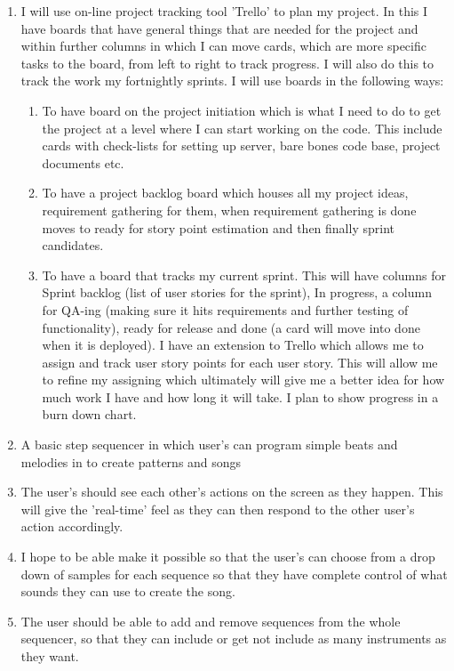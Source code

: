 \documentclass[a4paper]{article}
\begin{document}
\begin{enumerate}
    \item I will use on-line project tracking tool 'Trello' to plan my project. In this I have boards that have general things that are needed for the project and within further columns in which I can move cards, which are more specific tasks to the board, from left to right to track progress. I will also do this to track the work my fortnightly sprints. I will use boards in the following ways:
        \begin{enumerate}
            \item To have board on the project initiation which is what I need to do to get the project at a level where I can start working on the code. This include cards with check-lists for setting up server, bare bones code base, project documents etc.
            \item To have a project backlog board which houses all my project ideas, requirement gathering for them, when requirement gathering is done moves to ready for story point estimation and then finally sprint candidates.
            \item To have a board that tracks my current sprint. This will have columns for Sprint backlog (list of user stories for the sprint), In progress, a column for QA-ing (making sure it hits requirements and further testing of functionality), ready for release and done (a card will move into done when it is deployed). I have an extension to Trello which allows me to assign and track user story points for each user story. This will allow me to refine my assigning which ultimately will give me a better idea for how much work I have and how long it will take. I plan to show progress in a burn down chart.
        \end{enumerate}
    \item A basic step sequencer in which user's can program simple beats and melodies in to create patterns and songs
    \item The user's should see each other's actions on the screen as they happen. This will give the 'real-time' feel as they can then respond to the other user's action accordingly.
    \item I hope to be able make it possible so that the user's can choose from a drop down of samples for each sequence so that they have complete control of what sounds they can use to create the song.
    \item The user should be able to add and remove sequences from the whole sequencer, so that they can include or get not include as many instruments as they want.
    \end{enumerate}
\end{document}
